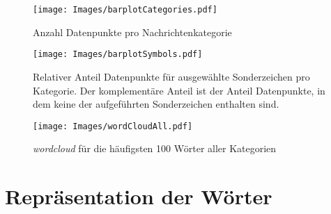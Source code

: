 \documentclass[8pt, xcolor = dvipsnames]{beamer}
\begin{document}
\begin{frame}

\begin{figure}[ht]
    \centering
\texttt{[image: Images/barplotCategories.pdf]} 
\caption{Anzahl Datenpunkte pro Nachrichtenkategorie}
\label{abb:barplotCategories}
\end{figure}

\end{frame}


\begin{frame}

\begin{figure}[ht]
    \centering
\texttt{[image: Images/barplotSymbols.pdf]} 
\caption{Relativer Anteil Datenpunkte für ausgewählte Sonderzeichen pro Kategorie. Der komplementäre Anteil ist der Anteil Datenpunkte, in dem keine der aufgeführten Sonderzeichen enthalten sind.}
\label{abb:barplotSymbols}
\end{figure}

\end{frame}


\begin{frame}
\begin{figure}[ht]
    \centering
\texttt{[image: Images/wordCloudAll.pdf]} 
\caption{\textit{wordcloud} für die häufigsten 100 Wörter aller Kategorien}
\label{abb:WordcloudAll}
\end{figure}
\end{frame}


\section{Repräsentation der Wörter}
\end{document}
